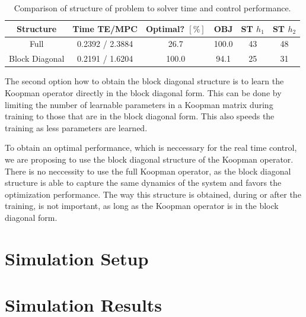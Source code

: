 \documentclass[preprint,12pt,authoryear]{elsarticle}
\begin{document}
\begin{table}[h]
  \centering
  \caption{Comparison of structure of problem to solver time and control performance.}
  \label{tab:block-diagonal}
  \begin{tabular}{cccccc}
      \toprule
        Structure & Time TE/MPC & Optimal? \([\%]\) & OBJ & ST \(h_1\) & ST \(h_2\) \\
        \midrule
        Full          & 0.2392 / 2.3884 & 26.7 & 100.0 & 43 & 48 \\
        Block Diagonal & 0.2191 / 1.6204 & 100.0 & 94.1 & 25 & 31 \\
        \bottomrule
  \end{tabular}
\end{table}

The second option how to obtain the block diagonal structure is to learn the Koopman operator directly in the block diagonal form. This can be done by limiting the number of learnable parameters in a Koopman matrix during training to those that are in the block diagonal form. This also speeds the training as less parameters are learned.

To obtain an optimal performance, which is neccessary for the real time control, we are proposing to use the block diagonal structure of the Koopman operator. There is no neccessity to use the full Koopman operator, as the block diagonal structure is able to capture the same dynamics of the system and favors the optimization performance. The way this structure is obtained, during or after the training, is not important, as long as the Koopman operator is in the block diagonal form.

\section{Simulation Setup}

\section{Simulation Results}
\label{sec:Results}
\end{document}
